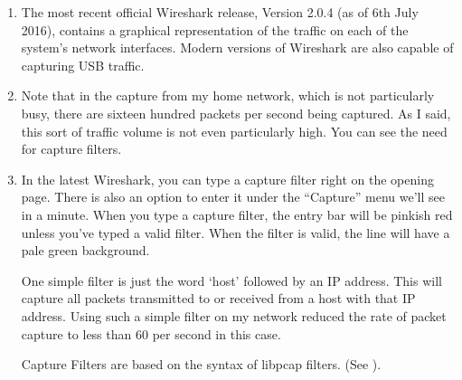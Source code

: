 \documentclass[12pt]{extarticle}
\newcommand{\bi}{\begin{itemize}}
\newcommand{\ei}{\end{itemize}}
\begin{document}

\begin{enumerate}
\item The most recent official Wireshark release, Version 2.0.4 (as of 6th July 2016), contains a graphical representation of the traffic on each of the system's network interfaces.  Modern versions of Wireshark are also capable of capturing USB traffic.
\item Note that in the capture from my home network, which is not particularly busy, there are sixteen hundred packets per second being captured.  As I said, this sort of traffic volume is not even particularly high.  You can see the need for capture filters.
\item In the latest Wireshark, you can type a capture filter right on the opening page.  There is also an option to enter it under the ``Capture'' menu we'll see in a minute.  When you type a capture filter, the entry bar will be pinkish red unless you've typed a valid filter.  When the filter is valid, the line will have a pale green background.

One simple filter is just the word `host' followed by an IP address.  This will capture all packets transmitted to or received from a host with that IP address.  Using such a simple filter on my network reduced the rate of packet capture to less than 60 per second in this case.

Capture Filters\cite{capturefilters} are based on the syntax of libpcap filters. (See \cite{libpcapfilters}).

\end{enumerate}


\end{document}
